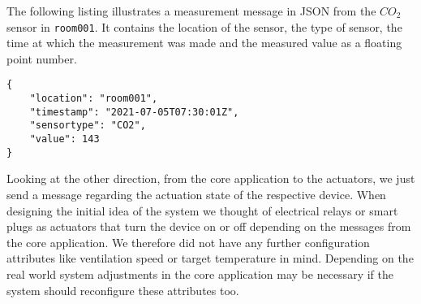 The following listing illustrates a measurement message in JSON from the $CO_2$ sensor in \texttt{room001}.
It contains the location of the sensor, the type of sensor, the time at which the measurement was made and the measured value as a floating point number.

\begin{verbatim}
{
    "location": "room001",
    "timestamp": "2021-07-05T07:30:01Z",
    "sensortype": "CO2",
    "value": 143
}
\end{verbatim}
Looking at the other direction, from the core application to the actuators, we just send a message regarding the actuation state of the respective device.
When designing the initial idea of the system we thought of electrical relays or smart plugs as actuators that turn the device on or off depending on the messages from the core application.
We therefore did not have any further configuration attributes like ventilation speed or target temperature in mind.
Depending on the real world system adjustments in the core application may be necessary if the system should reconfigure these attributes too.

